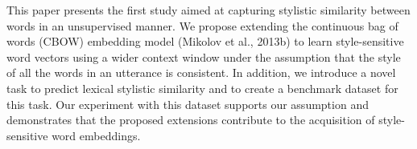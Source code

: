 This paper presents the first study aimed at capturing stylistic similarity between words in an unsupervised manner. We propose extending the continuous bag of words (CBOW) embedding model (Mikolov et al., 2013b) to learn style-sensitive word vectors using a wider context window under the assumption that the style of all the words in an utterance is consistent. In addition, we introduce a novel task to predict lexical stylistic similarity and to create a benchmark dataset for this task. Our experiment with this dataset supports our assumption and demonstrates that the proposed extensions contribute to the acquisition of style-sensitive word embeddings.
